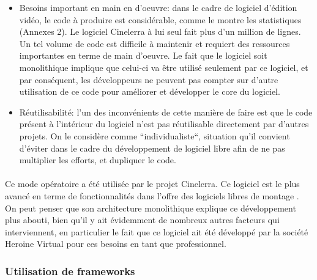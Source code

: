 \begin{itemize}

  \item  {Besoins important en main en d'oeuvre: dans le cadre de logiciel
    d'édition vidéo, le code à produire est considérable, comme
    le montre les statistiques (Annexes 2). Le logiciel Cinelerra
    à lui seul fait plus d'un million de lignes. Un tel volume
    de code est difficile à maintenir et requiert des ressources
    importantes en terme de main d'oeuvre. Le fait que le logiciel
    soit monolithique implique que celui-ci va
    être utilisé seulement par ce logiciel, et par conséquent, les
    développeurs ne peuvent pas compter sur d'autre utilisation de ce
    code pour améliorer et développer le core du logiciel.}

  \item  {Réutilisabilité: l'un des inconvénients de cette manière
  de faire est que le code
    présent à l'intérieur du logiciel n'est pas réutilisable
    directement par d'autres projets. On le considère comme
    ``individualiste``, situation qu'il convient d'éviter dans le cadre
    du développement de logiciel libre afin de ne pas multiplier les
    efforts, et dupliquer le code.}

\end{itemize}

\paragraph{}

Ce mode opératoire a été utilisée par le projet Cinelerra. Ce
logiciel est le plus avancé en terme de fonctionnalités dans l'offre
des logiciels libres de montage . On peut penser que son architecture
monolithique explique ce développement plus
abouti, bien qu'il y ait évidemment de nombreux autres facteurs
qui interviennent, en particulier le fait que ce logiciel ait été
développé par la société Heroine Virtual pour ces besoins en tant
que professionnel.

\subsubsection {Utilisation de  frameworks }

\paragraph{}

